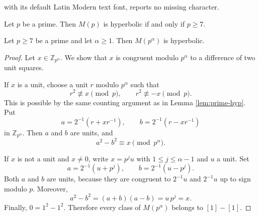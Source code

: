 \documentclass[10pt,a4paper]{amsart}
\newcommand{\cl}[1]{\left[#1\right]}
\begin{document}
with its default Latin Modern text font, reports no missing character.
\begin{lem}\label{lem:prime-hyp}
Let $p$ be a prime.  Then $M(p)$ is hyperbolic if and only if $p\ge7$.
\end{lem}

\begin{lem}\label{lem:prime-power-hyp}
Let $p\ge7$ be a prime and let $\alpha\ge1$.  Then $M(p^\alpha)$ is hyperbolic.
\end{lem}

\begin{proof}
Let $x\in\mathbb Z_{p^\alpha}$.  We show that $x$ is congruent modulo $p^\alpha$ to a difference of two unit squares.

If $x$ is a unit, choose a unit $r$ modulo $p^\alpha$ such that
\[
        r^2\not\equiv x\pmod p,
        \qquad
        r^2\not\equiv -x\pmod p.
\]
This is possible by the same counting argument as in Lemma \ref{lem:prime-hyp}.  Put
\[
        a=2^{-1}(r+xr^{-1}),
        \qquad
        b=2^{-1}(r-xr^{-1})
\]
in $\mathbb Z_{p^\alpha}$.  Then $a$ and $b$ are units, and
\[
        a^2-b^2\equiv x\pmod{p^\alpha}.
\]

If $x$ is not a unit and $x\ne0$, write $x=p^j u$ with $1\le j\le\alpha-1$ and $u$ a unit.  Set
\[
        a=2^{-1}(u+p^j),
        \qquad
        b=2^{-1}(u-p^j).
\]
Both $a$ and $b$ are units, because they are congruent to $2^{-1}u$ and $2^{-1}u$ up to sign modulo $p$.  Moreover,
\[
        a^2-b^2=(a+b)(a-b)=u\,p^j=x.
\]
Finally, $0=1^2-1^2$.  Therefore every class of $M(p^\alpha)$ belongs to $\cl1-\cl1$.
\end{proof}
\end{document}
